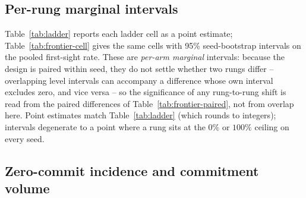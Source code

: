 \documentclass{article}
\begin{document}
\subsection{Per-rung marginal intervals}

Table~\ref{tab:ladder} reports each ladder cell as a point estimate; Table~\ref{tab:frontier-cell} gives the same cells with 95\% seed-bootstrap intervals on the pooled first-sight rate. These are \emph{per-arm marginal} intervals: because the design is paired within seed, they do not settle whether two rungs differ -- overlapping level intervals can accompany a difference whose own interval excludes zero, and vice versa -- so the significance of any rung-to-rung shift is read from the paired differences of Table~\ref{tab:frontier-paired}, not from overlap here. Point estimates match Table~\ref{tab:ladder} (which rounds to integers); intervals degenerate to a point where a rung sits at the $0\%$ or $100\%$ ceiling on every seed.

\begin{table}[H]
\centering \caption{\textbf{Per-cell first-sight commitment for each frontier model across the ladder}, pooled among realized commitments, with 95\% seed-bootstrap intervals ($N=24$ canonical seeds, 10,000 resamples, RNG seed 0; per-arm marginal intervals, re-pooled ratio). These annotate the point estimates of Table~\ref{tab:ladder}; rung-to-rung significance is given by the paired differences of Table~\ref{tab:frontier-paired}, not by interval overlap here.} \label{tab:frontier-cell} \small {}
\end{table}

\subsection{Zero-commit incidence and commitment volume} \label{app:zero-commit}
\end{document}
